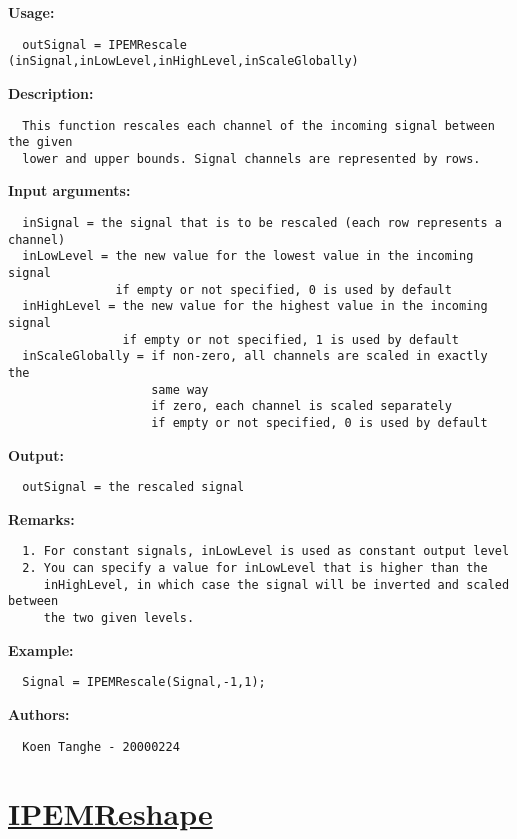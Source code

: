 \textbf{Usage:}
\begin{verbatim}  outSignal = IPEMRescale (inSignal,inLowLevel,inHighLevel,inScaleGlobally)

\end{verbatim}
\textbf{Description:}
\begin{verbatim}  This function rescales each channel of the incoming signal between the given
  lower and upper bounds. Signal channels are represented by rows.

\end{verbatim}
\textbf{Input arguments:}
\begin{verbatim}  inSignal = the signal that is to be rescaled (each row represents a channel)
  inLowLevel = the new value for the lowest value in the incoming signal
               if empty or not specified, 0 is used by default
  inHighLevel = the new value for the highest value in the incoming signal
                if empty or not specified, 1 is used by default
  inScaleGlobally = if non-zero, all channels are scaled in exactly the
                    same way
                    if zero, each channel is scaled separately
                    if empty or not specified, 0 is used by default

\end{verbatim}
\textbf{Output:}
\begin{verbatim}  outSignal = the rescaled signal

\end{verbatim}
\textbf{Remarks:}
\begin{verbatim}  1. For constant signals, inLowLevel is used as constant output level
  2. You can specify a value for inLowLevel that is higher than the
     inHighLevel, in which case the signal will be inverted and scaled between
     the two given levels.

\end{verbatim}
\textbf{Example:}
\begin{verbatim}  Signal = IPEMRescale(Signal,-1,1);

\end{verbatim}
\textbf{Authors:}
\begin{verbatim}  Koen Tanghe - 20000224
\end{verbatim}


\newpage
\section*{\hyperlink{Concepts:IPEMReshape}{IPEMReshape}}
\hypertarget{FuncRef:IPEMReshape}{}

